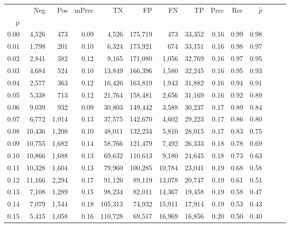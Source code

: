 \begin{tabular}{rrrrrrrrrrrrrr}
\toprule
{} &     Neg &    Pos & mPrec &       TN &       FP &      FN &      TP &  Prec &   Rec & $\hat{p}$ \\
p    &         &        &       &          &          &         &         &       &       &           \\
\midrule
0.00 &   4,526 &    473 &  0.09 &    4,526 &  175,719 &     473 &  33,352 &  0.16 &  0.99 &      0.98 \\
0.01 &   1,798 &    201 &  0.10 &    6,324 &  173,921 &     674 &  33,151 &  0.16 &  0.98 &      0.97 \\
0.02 &   2,841 &    382 &  0.12 &    9,165 &  171,080 &   1,056 &  32,769 &  0.16 &  0.97 &      0.95 \\
0.03 &   4,684 &    524 &  0.10 &   13,849 &  166,396 &   1,580 &  32,245 &  0.16 &  0.95 &      0.93 \\
0.04 &   2,577 &    363 &  0.12 &   16,426 &  163,819 &   1,943 &  31,882 &  0.16 &  0.94 &      0.91 \\
0.05 &   5,338 &    713 &  0.12 &   21,764 &  158,481 &   2,656 &  31,169 &  0.16 &  0.92 &      0.89 \\
0.06 &   9,039 &    932 &  0.09 &   30,803 &  149,442 &   3,588 &  30,237 &  0.17 &  0.89 &      0.84 \\
0.07 &   6,772 &  1,014 &  0.13 &   37,575 &  142,670 &   4,602 &  29,223 &  0.17 &  0.86 &      0.80 \\
0.08 &  10,436 &  1,208 &  0.10 &   48,011 &  132,234 &   5,810 &  28,015 &  0.17 &  0.83 &      0.75 \\
0.09 &  10,755 &  1,682 &  0.14 &   58,766 &  121,479 &   7,492 &  26,333 &  0.18 &  0.78 &      0.69 \\
0.10 &  10,866 &  1,688 &  0.13 &   69,632 &  110,613 &   9,180 &  24,645 &  0.18 &  0.73 &      0.63 \\
0.11 &  10,328 &  1,604 &  0.13 &   79,960 &  100,285 &  10,784 &  23,041 &  0.19 &  0.68 &      0.58 \\
0.12 &  11,166 &  2,294 &  0.17 &   91,126 &   89,119 &  13,078 &  20,747 &  0.19 &  0.61 &      0.51 \\
0.13 &   7,108 &  1,289 &  0.15 &   98,234 &   82,011 &  14,367 &  19,458 &  0.19 &  0.58 &      0.47 \\
0.14 &   7,079 &  1,544 &  0.18 &  105,313 &   74,932 &  15,911 &  17,914 &  0.19 &  0.53 &      0.43 \\
0.15 &   5,415 &  1,058 &  0.16 &  110,728 &   69,517 &  16,969 &  16,856 &  0.20 &  0.50 &      0.40 \\

\end{tabular}
